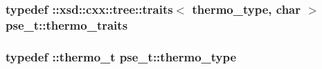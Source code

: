 \hypertarget{classpse__t_a3c730d4487efb386ba2d36da2bd1dbd0}{
\subsubsection[{thermo\-\_\-traits}]{\setlength{\rightskip}{0pt plus 5cm}typedef \-::xsd\-::cxx\-::tree\-::traits$<$ {\bf thermo\-\_\-type}, char $>$ {\bf pse\-\_\-t\-::thermo\-\_\-traits}}}\label{classpse__t_a3c730d4487efb386ba2d36da2bd1dbd0}
\hypertarget{classpse__t_aebaae32f697fb451e7bab83078867d4e}{
\subsubsection[{thermo\-\_\-type}]{\setlength{\rightskip}{0pt plus 5cm}typedef \-::{\bf thermo\-\_\-t} {\bf pse\-\_\-t\-::thermo\-\_\-type}}}\label{classpse__t_aebaae32f697fb451e7bab83078867d4e}


